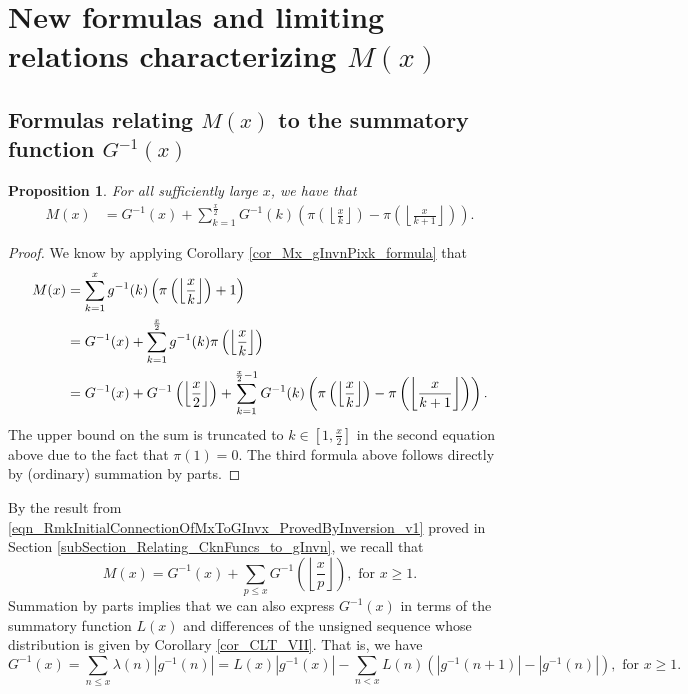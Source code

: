 \documentclass[11pt,reqno,a4letter]{article}
\numberwithin{figure}{section}
\numberwithin{table}{section}
\newcommand{\Floor}[2]{\ensuremath{\left\lfloor \frac{#1}{#2} \right\rfloor}}
\theoremstyle{plain}
\newtheorem{prop}[theorem]{Proposition}
\numberwithin{theorem}{section}
\theoremstyle{definition}
\begin{document}
\section{New formulas and limiting relations characterizing $M(x)$} 
\label{Section_KeyApplications} 

\subsection{Formulas relating $M(x)$ to the summatory function $G^{-1}(x)$} 

\begin{prop} 
\label{prop_Mx_SBP_IntegralFormula} 
For all sufficiently large $x$, we have that 
\begin{align} 
\label{eqn_pf_tag_v2-restated_v2} 
M(x) & = G^{-1}(x) + 
     \sum_{k=1}^{\frac{x}{2}} G^{-1}(k) \left(
     \pi\left(\Floor{x}{k}\right) - \pi\left(\Floor{x}{k+1}\right) 
     \right). 
\end{align} 
\end{prop} 
\begin{proof} 
We know by applying Corollary \ref{cor_Mx_gInvnPixk_formula} that 
\begin{align} 
\notag
M(x) & = \sum_{k=1}^{x} g^{-1}(k) \left(\pi\left(\Floor{x}{k}\right)+1\right) \\ 
\notag 
     & = G^{-1}(x) + \sum_{k=1}^{\frac{x}{2}} g^{-1}(k) \pi\left(\Floor{x}{k}\right) \\ 
\notag 
     & = G^{-1}(x) + G^{-1}\left(\Floor{x}{2}\right) + 
     \sum_{k=1}^{\frac{x}{2}-1} G^{-1}(k) \left( 
     \pi\left(\Floor{x}{k}\right) - \pi\left(\Floor{x}{k+1}\right) 
     \right).
\end{align} 
The upper bound on the sum is truncated to $k \in \left[1, \frac{x}{2}\right]$ in the second equation 
above due to the fact that $\pi(1) = 0$. 
The third formula above follows directly by (ordinary) summation by parts. 
\end{proof} 

By the result from \eqref{eqn_RmkInitialConnectionOfMxToGInvx_ProvedByInversion_v1} 
proved in Section \ref{subSection_Relating_CknFuncs_to_gInvn}, 
we recall that 
\[
M(x) = G^{-1}(x) + \sum_{p \leq x} G^{-1}\left(\Floor{x}{p}\right), 
     \text{ for } x \geq 1. 
\]
Summation by parts implies that we can also express $G^{-1}(x)$ in terms 
of the summatory function $L(x)$ and differences of the unsigned sequence 
whose distribution is given by 
Corollary \ref{cor_CLT_VII}. That is, we have  
\[
G^{-1}(x) 
     = \sum_{n \leq x} \lambda(n) |g^{-1}(n)| 
     = L(x)|g^{-1}(x)| - \sum_{n < x} 
     L(n) \left(|g^{-1}(n+1)| - |g^{-1}(n)|\right), 
     \text{ for } x \geq 1. 
\]
\end{document}
